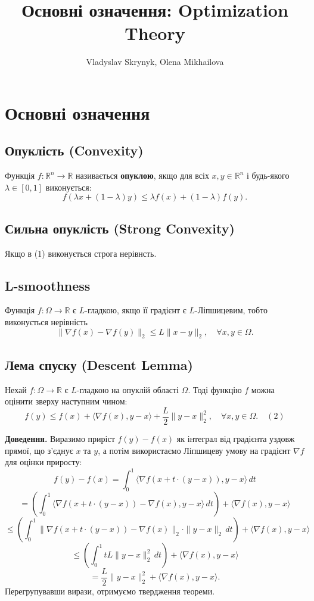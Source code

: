 \documentclass[a4paper,12pt]{article}
\title{Основні означення: Optimization Theory}
\author{Vladyslav Skrynyk, Olena Mikhailova}
\begin{document}
\maketitle

\section{Основні означення}

\subsection{Опуклість (Convexity)}
Функція $f: \mathbb{R}^n \to \mathbb{R}$ називається \textbf{опуклою}, якщо для всіх $x, y \in \mathbb{R}^n$ і будь-якого $\lambda \in [0,1]$ виконується:
\[
    f(\lambda x + (1 - \lambda)y) \leq \lambda f(x) + (1 - \lambda) f(y). \tag{1}
\]
\subsection{Сильна опуклість (Strong Convexity)}
Якщо в (1) виконується строга нерівнсть.

\subsection{L-smoothness}
Функція \( f: \Omega \to \mathbb{R} \) є \( L \)-гладкою, якщо її градієнт є 
\( L \)-Ліпшицевим, тобто виконується нерівність  
\[
\|\nabla f(x) - \nabla f(y)\|_2 \leq L \|x - y\|_2, \quad \forall x, y \in \Omega.
\]


\subsection{Лема спуску (Descent Lemma)}
Нехай \( f: \Omega \to \mathbb{R} \) є \( L \)-гладкою на опуклій області \( \Omega \).  
Тоді функцію \( f \) можна оцінити зверху наступним чином:
\[
f(y) \leq f(x) + \langle \nabla f(x), y - x \rangle + \frac{L}{2} \|y - x\|_2^2, \quad \forall x, y \in \Omega. \quad (2)
\]
  
\textbf{Доведення.} Виразимо приріст \( f(y) - f(x) \) як інтеграл від градієнта уздовж прямої, що з'єднує \( x \) та \( y \),  
а потім використаємо Ліпшицеву умову на градієнт \( \nabla f \) для оцінки приросту:
\[
f(y) - f(x) = \int_0^1 \langle \nabla f(x + t \cdot (y - x)), y - x \rangle \, dt
\]
\[
= \left( \int_0^1 \langle \nabla f(x + t \cdot (y - x)) - \nabla f(x), y - x \rangle \, dt \right) + \langle \nabla f(x), y - x \rangle
\]
\[
\leq \left( \int_0^1 \|\nabla f(x + t \cdot (y - x)) - \nabla f(x)\|_2 \cdot \|y - x\|_2 \, dt \right) + \langle \nabla f(x), y - x \rangle
\]
\[
\leq \left( \int_0^1 t L \|y - x\|_2^2 \, dt \right) + \langle \nabla f(x), y - x \rangle
\]
\[
= \frac{L}{2} \|y - x\|_2^2 + \langle \nabla f(x), y - x \rangle.
\]
Перегрупувавши вирази, отримуємо твердження теореми.
\end{document}
